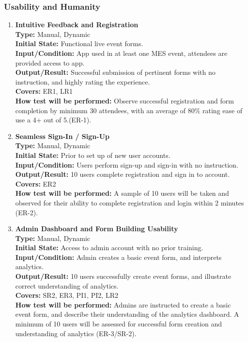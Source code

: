 \documentclass[12pt, titlepage]{article}
\begin{document}
\subsubsection{Usability and Humanity}
\begin{enumerate}[label=\bfseries UH-\arabic*:, wide=0pt]
  \item \label{test-UH1} \textbf{Intuitive Feedback and Registration}\\[2mm]
    {\bf Type:} Manual, Dynamic\\
    {\bf Initial State:} Functional live event forms.\\
    {\bf Input/Condition:} App used in at least one MES event, attendees are provided access to app.\\
    {\bf Output/Result:} Successful submission of pertinent forms with no instruction, and highly rating the experience.\\
    {\bf Covers:} ER1, LR1\\
    {\bf How test will be performed:} Observe successful registration and form completion by minimum 30 attendees, with an average of 80\% rating ease of use a 4+ out of 5.(ER-1).

  \item \label{test-UH2} \textbf{Seamless Sign-In / Sign-Up}\\[2mm]
    {\bf Type:} Manual, Dynamic\\
    {\bf Initial State:} Prior to set up of new user accounts.\\
    {\bf Input/Condition:} Users perform sign-up and sign-in with no instruction.\\
    {\bf Output/Result:} 10 users complete registration and sign in to account.\\
    {\bf Covers:} ER2\\
    {\bf How test will be performed:} A sample of 10 users will be taken and observed for their ability to complete registration and login within 2 minutes (ER-2).

  \item \label{test-UH3} \textbf{Admin Dashboard and Form Building Usability}\\[2mm]
    {\bf Type:} Manual, Dynamic\\
    {\bf Initial State:} Access to admin account with no prior training.\\
    {\bf Input/Condition:} Admin creates a basic event form, and interprets analytics.\\
    {\bf Output/Result:} 10 users successfully create event forms, and illustrate correct understanding of analytics.\\
    {\bf Covers:} SR2, ER3, PI1, PI2, LR2\\
    {\bf How test will be performed:} Admins are instructed to create a basic event form, and describe their understanding of the analytics dashboard. A minimum of 10 users will be assessed for successful form creation and understanding of analytics (ER-3/SR-2).


\end{enumerate}
\end{document}
